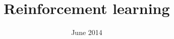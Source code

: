 \documentclass[]{report}
\title{Reinforcement learning}
\date{June 2014}
\begin{document}




\tableofcontents

\listoftodos









\printbibliography


\end{document}
